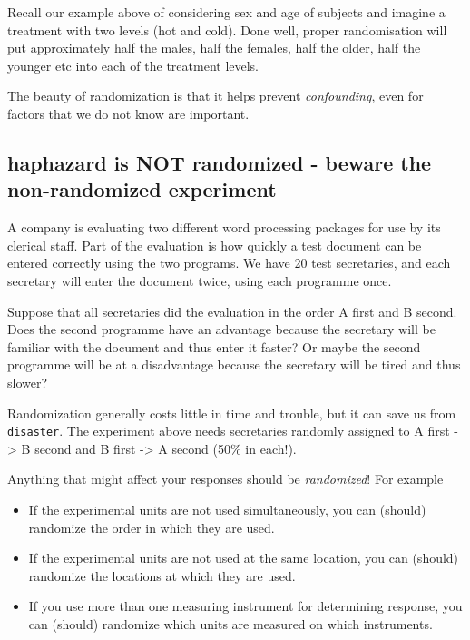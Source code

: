 \documentclass[
]{book}
\providecommand{\tightlist}{%
  \setlength{\itemsep}{0pt}\setlength{\parskip}{0pt}}
\begin{document}
Recall our example above of considering sex and age of subjects and imagine a treatment with two levels (hot and cold). Done well, proper randomisation will put approximately half the males, half the females, half the older, half the younger etc into each of the treatment levels.

The beauty of randomization is that it helps prevent \emph{confounding}, even for factors that we do not know are important.

\hypertarget{haphazard-is-not-randomized---beware-the-non-randomized-experiment}{%
\subsection{\texorpdfstring{\textbf{haphazard} is NOT randomized - beware the non-randomized experiment --}{haphazard is NOT randomized - beware the non-randomized experiment --}}\label{haphazard-is-not-randomized---beware-the-non-randomized-experiment}}

A company is evaluating two different word processing packages for use by its clerical staff. Part of the evaluation is how quickly a test document can be entered correctly using the two programs. We have 20 test secretaries, and each secretary will enter the document twice, using each programme once.

Suppose that all secretaries did the evaluation in the order A first and B second. Does the second programme have an advantage because the secretary will be familiar with the document and thus enter it faster? Or maybe the second programme will be at a disadvantage because the secretary will be tired and thus slower?

Randomization generally costs little in time and trouble, but it can save us from \texttt{disaster}. The experiment above needs secretaries randomly assigned to A first -\textgreater{} B second and B first -\textgreater{} A second (50\% in each!).

Anything that might affect your responses should be \emph{randomized}! For example

\begin{itemize}
\tightlist
\item
  If the experimental units are not used simultaneously, you can (should) randomize the order in which they are used.
\item
  If the experimental units are not used at the same location, you can (should) randomize the locations at which they are used.
\item
  If you use more than one measuring instrument for determining response, you can (should) randomize which units are measured on which instruments.
\end{itemize}
\end{document}
